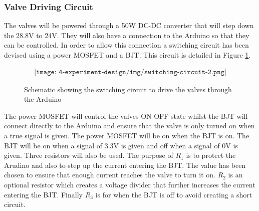 \newpage
\subsubsection{Valve Driving Circuit}
The valves will be powered through a 50W DC-DC converter that will step down the 28.8V to 24V. They will also have a connection to the Arduino so that they can be controlled. In order to allow this connection a switching circuit has been devised using a power MOSFET and a BJT. This circuit is detailed in Figure \ref{fig:switchcir}.

\begin{figure}[H]
    \begin{align*}
        \texttt{[image: 4-experiment-design/img/switching-circuit-2.png]}
    \end{align*}
    \caption{Schematic showing the switching circuit to drive the valves through the Arduino}\label{fig:switchcir}
\end{figure}

The power MOSFET will control the valves ON-OFF state whilst the BJT will connect directly to the Arduino and ensure that the valve is only turned on when a true signal is given. The power MOSFET will be on when the BJT is on. The BJT will be on when a signal of 3.3V is given and off when a signal of 0V is given. Three resistors will also be used. The purpose of $R_{1}$ is to protect the Arudino and also to step up the current entering the BJT. The value has been chosen to ensure that enough current reaches the valve to turn it on. $R_{2}$ is an optional resistor which creates a voltage divider that further increases the current entering the BJT. Finally $R_{3}$ is for when the BJT is off to avoid creating a short circuit. 


\raggedbottom